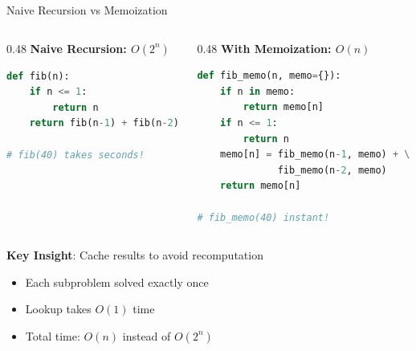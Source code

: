 \documentclass[aspectratio=169]{beamer}
\begin{document}
\begin{frame}[fragile]{Naive Recursion vs Memoization}
\begin{columns}
\begin{column}{0.48\textwidth}
\textbf{Naive Recursion: $O(2^n)$}
\begin{lstlisting}[language=Python, basicstyle=\ttfamily\tiny]
def fib(n):
    if n <= 1:
        return n
    return fib(n-1) + fib(n-2)

# fib(40) takes seconds!
\end{lstlisting}
\end{column}

\begin{column}{0.48\textwidth}
\textbf{With Memoization: $O(n)$}
\begin{lstlisting}[language=Python, basicstyle=\ttfamily\tiny]
def fib_memo(n, memo={}):
    if n in memo:
        return memo[n]
    if n <= 1:
        return n
    memo[n] = fib_memo(n-1, memo) + \
              fib_memo(n-2, memo)
    return memo[n]

# fib_memo(40) instant!
\end{lstlisting}
\end{column}
\end{columns}

\vspace{0.5cm}

\textbf{Key Insight}: Cache results to avoid recomputation
\begin{itemize}
  \item Each subproblem solved exactly once
  \item Lookup takes $O(1)$ time
  \item Total time: $O(n)$ instead of $O(2^n)$
\end{itemize}
\end{frame}
\end{document}
